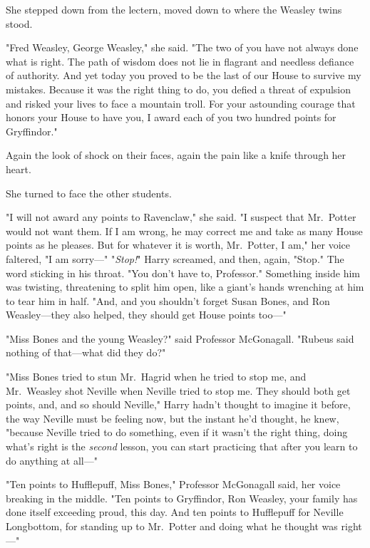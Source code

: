She stepped down from the lectern, moved down to where the Weasley twins stood.

"Fred Weasley, George Weasley," she said. "The two of you have not always done 
what is right. The path of wisdom does not lie in flagrant and needless 
defiance of authority. And yet today you proved to be the last of our House to 
survive my mistakes. Because it was the right thing to do, you defied a threat 
of expulsion and risked your lives to face a mountain troll. For your 
astounding courage that honors your House to have you, I award each of you two 
hundred points for Gryffindor."

Again the look of shock on their faces, again the pain like a knife through her 
heart.

She turned to face the other students.

"I will not award any points to Ravenclaw," she said. "I suspect that 
Mr.~Potter would not want them. If I am wrong, he may correct me and take as 
many House points as he pleases. But for whatever it is worth, Mr.~Potter, I 
am," her voice faltered, "I am sorry---"
\sbreak
"\emph{Stop!}" Harry screamed, and then, again, "Stop." The word sticking in 
his throat. "You don't have to, Professor." Something inside him was twisting, 
threatening to split him open, like a giant's hands wrenching at him to tear 
him in half. "And, and you shouldn't forget Susan Bones, and Ron Weasley---they 
also helped, they should get House points too---"

"Miss Bones and the young Weasley?" said Professor McGonagall. "Rubeus said 
nothing of that---what did they do?"

"\emph{}Miss Bones tried to stun Mr.~Hagrid when he tried to stop me, and 
Mr.~Weasley shot Neville when Neville tried to stop me. They should both get 
points, and, and so should Neville," Harry hadn't thought to imagine it before, 
the way Neville must be feeling now, but the instant he'd thought, he knew, 
"because Neville tried to do something, even if it wasn't the right thing, 
doing what's right is the \emph{second} lesson, you can start practicing that 
after you learn to do anything at all---"

"Ten points to Hufflepuff, Miss Bones," Professor McGonagall said, her voice 
breaking in the middle. "Ten points to Gryffindor, Ron Weasley, your family has 
done itself exceeding proud, this day. And ten points to Hufflepuff for Neville 
Longbottom, for standing up to Mr.~Potter and doing what he thought was 
right---"

